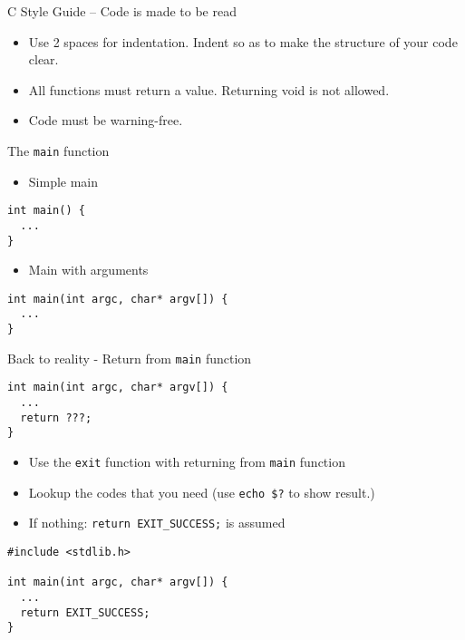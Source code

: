 \documentclass{beamer}
\begin{document}
\begin{frame}[fragile]{C Style Guide -- Code is made to be read}
\begin{itemize}
Always use curly braces. The opening brace should be on the same line as the declaration.
\begin{lstlisting}
int f() {
  for (int i = 0; i < 100; i++) {
    if (i % 2 == 0) {
      // Do something.
    }
  }
  // Return something.
}
\end{lstlisting}

\item Use 2 spaces for indentation. Indent so as to make the structure of your code clear.

\item All functions must return a value. Returning void is not allowed.

\item Code must be warning-free.
\end{itemize}

\end{frame}


\begin{frame}[fragile]{The \lstinline{main} function}
\begin{itemize}
\item Simple main
\end{itemize}
\begin{lstlisting}[frame=single]
int main() {
  ...
}

\end{lstlisting}

\begin{itemize}
\item Main with arguments
\end{itemize}
\begin{lstlisting}[frame=single]
int main(int argc, char* argv[]) {
  ...
}

\end{lstlisting}

\end{frame}

\begin{frame}[fragile]{Back to reality - Return from \texttt{main} function}
\begin{lstlisting}[frame=single]
int main(int argc, char* argv[]) {
  ...
  return ???;
}
\end{lstlisting}
\pause
\begin{itemize}
\item Use the \lstinline{exit} function with returning from \lstinline{main} function
\item Lookup the codes that you need (use \texttt{echo \$?} to show result.)
\item If nothing: \lstinline{return EXIT_SUCCESS;} is assumed
\end{itemize}

\begin{lstlisting}[frame=single]
#include <stdlib.h>

int main(int argc, char* argv[]) {
  ...
  return EXIT_SUCCESS;
}
\end{lstlisting}
\end{frame}
\end{document}
